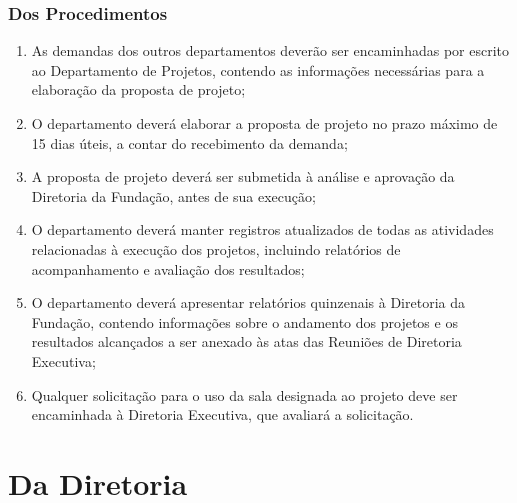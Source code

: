         \subsection{Dos Procedimentos}
        \begin{enumerate}
            \item As demandas dos outros departamentos deverão ser encaminhadas por escrito ao Departamento de Projetos, contendo as informações necessárias para a elaboração da proposta de projeto;
            \item O departamento deverá elaborar a proposta de projeto no prazo máximo de 15 dias úteis, a contar do recebimento da demanda;
            \item A proposta de projeto deverá ser submetida à análise e aprovação da Diretoria da Fundação, antes de sua execução;
            \item O departamento deverá manter registros atualizados de todas as atividades relacionadas à execução dos projetos, incluindo relatórios de acompanhamento e avaliação dos resultados;
            \item O departamento deverá apresentar relatórios quinzenais à Diretoria da Fundação, contendo informações sobre o andamento dos projetos e os resultados alcançados a ser anexado às atas das Reuniões de Diretoria Executiva;
            \item Qualquer solicitação para o uso da sala designada ao projeto deve ser encaminhada à Diretoria Executiva, que avaliará a solicitação.  
        \end{enumerate}
         
\chapter{Da Diretoria}

